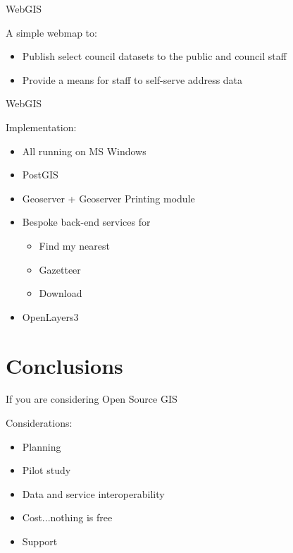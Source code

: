 \begin{frame}{WebGIS}
	\begin{block}{A simple webmap to:}
		\begin{itemize}
			\item Publish select council datasets to the public and council staff
			\item Provide a means for staff to self-serve address data 
		\end{itemize}
	\end{block}	
\end{frame}

\begin{frame}{WebGIS}
	\begin{block}{Implementation:}
		\begin{itemize}
			\item All running on MS Windows
			\item PostGIS
			\item Geoserver + Geoserver Printing module
			\item Bespoke back-end services for
			\begin{itemize}
				\item Find my nearest
				\item Gazetteer
				\item Download
			\end{itemize}
			\item OpenLayers3
		\end{itemize}
	\end{block}	
\end{frame}

\section{Conclusions}
\begin{frame}{If you are considering Open Source GIS}
	\begin{block}{Considerations:}
		\begin{itemize}
			\item Planning
			\item Pilot study
			\item Data and service interoperability
			\item Cost...nothing is free
			\item Support
		\end{itemize}
	\end{block}	
\end{frame}






